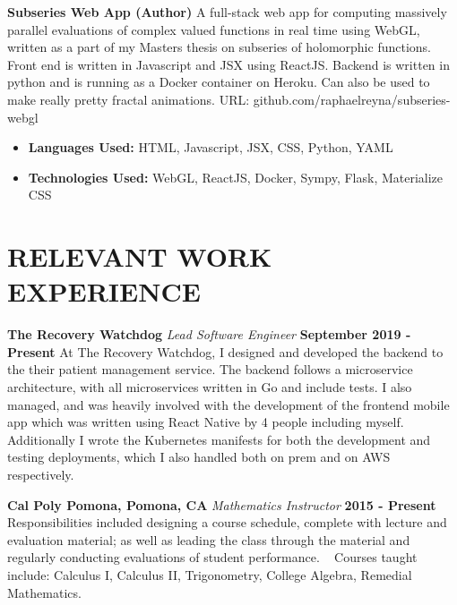 \documentclass[margin]{./res}
\begin{document}
\begin{resume}
{\bf Subseries Web App (Author)}\newline
A full-stack web app for computing massively parallel evaluations of complex
valued functions in real time using WebGL, written as a part of my Masters thesis on subseries of holomorphic functions.
Front end is written in Javascript and JSX using ReactJS.
Backend is written in python and is running as a Docker container on Heroku.
Can also be used to make really pretty fractal animations.
URL: github.com/raphaelreyna/subseries-webgl
\begin{multicols}{2}
\begin{itemize}
\item {\bf Languages Used: }\newline HTML, Javascript, JSX, CSS, Python, YAML
  \columnbreak
\item {\bf Technologies Used: }\newline WebGL, ReactJS,
  Docker, Sympy, Flask, Materialize CSS
\end{itemize}
\end{multicols}

\section{RELEVANT WORK EXPERIENCE}
{\bf The Recovery Watchdog}\newline
{\it Lead Software Engineer}\newline
{\bf September 2019 - Present}\newline
At The Recovery Watchdog, I designed and developed the backend to the their patient management service.
The backend follows a microservice architecture, with all microservices written in Go and include tests.
I also managed, and was heavily involved with the development of the frontend mobile app which was written using React Native by 4 people including myself.
Additionally I wrote the Kubernetes manifests for both the development and testing deployments, which I also handled both on prem and on AWS respectively.

{\bf Cal Poly Pomona, Pomona, CA}\newline
{\it Mathematics Instructor}\newline
{\bf 2015 - Present}\newline
Responsibilities included designing a course schedule, complete with lecture and
evaluation material; as well as leading the class through the material and
regularly conducting evaluations of student performance.\newline
\ \newline
Courses taught include: Calculus I, Calculus II, Trigonometry, College Algebra,
Remedial Mathematics.


\end{resume}
\end{document}
